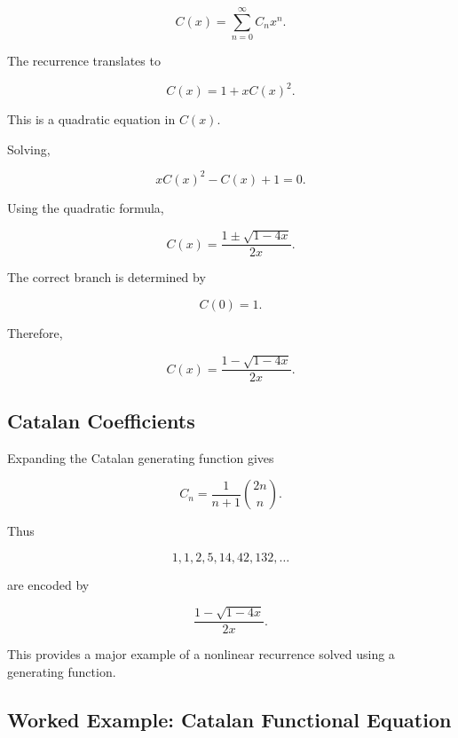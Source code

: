 \[
C(x)
=
\sum_{n=0}^{\infty}C_nx^n.
\]

The recurrence translates to

\[
\boxed{
C(x)
=
1+xC(x)^2.
}
\]

This is a quadratic equation in \(C(x)\).

Solving,

\[
xC(x)^2-C(x)+1=0.
\]

Using the quadratic formula,

\[
C(x)
=
\frac{1\pm\sqrt{1-4x}}{2x}.
\]

The correct branch is determined by

\[
C(0)=1.
\]

Therefore,

\[
\boxed{
C(x)
=
\frac{1-\sqrt{1-4x}}{2x}.
}
\]

\subsection{Catalan Coefficients}
\label{subsec:catalan-coefficients}

Expanding the Catalan generating function gives

\[
\boxed{
C_n
=
\frac{1}{n+1}\binom{2n}{n}.
}
\]

Thus

\[
1,1,2,5,14,42,132,\ldots
\]

are encoded by

\[
\frac{1-\sqrt{1-4x}}{2x}.
\]

This provides a major example of a nonlinear recurrence solved using a
generating function.

\subsection{Worked Example: Catalan Functional Equation}
\label{subsec:worked-catalan-gf}

